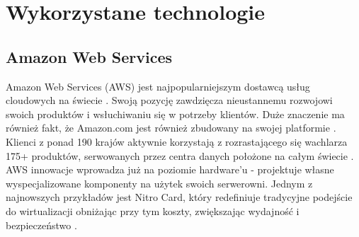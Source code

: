 \chapter{Wykorzystane technologie}
\label{cha:tech-stack}

\section{Amazon Web Services}
Amazon Web Services (AWS) jest najpopularniejszym dostawcą usług cloudowych na świecie \cite{AWS-what}. 
Swoją pozycję zawdzięcza nieustannemu rozwojowi swoich produktów i wsłuchiwaniu się w potrzeby klientów.
Duże znaczenie ma również fakt, że Amazon.com jest również zbudowany na swojej platformie \cite{AS3}.
Klienci z ponad 190 krajów aktywnie korzystają z rozrastającego się wachlarza 175+ produktów, serwowanych przez centra danych położone na całym świecie \cite{AWS-O}.
AWS innowacje wprowadza już na poziomie hardware'u - projektuje własne wyspecjalizowane komponenty na użytek swoich serwerowni.
Jednym z najnowszych przykładów jest Nitro Card, 
który redefiniuje tradycyjne podejście do wirtualizacji obniżając przy tym koszty, zwiększając wydajność i bezpieczeństwo \cite{AWS-Nitro}.


